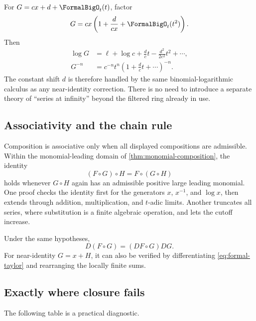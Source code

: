 \documentclass[11pt,oneside]{article}
\numberwithin{equation}{section}
\theoremstyle{definition}
\begin{document}
For \(G=cx+d+\FormalBigO_t(t)\), factor
\[
  G=cx\left(1+\frac{d}{cx}+\FormalBigO_t(t^2)\right).
\]
Then
\begin{align*}
  \log G
  &=\ell+\log c+\frac{d}{c}t-\frac{d^2}{2c^2}t^2+\cdots,\\
  G^{-n}
  &=c^{-n}t^n\left(1+\frac{d}{c}t+\cdots\right)^{-n}.
\end{align*}
The constant shift \(d\) is therefore handled by the same binomial-logarithmic
calculus as any near-identity correction.  There is no need to introduce a
separate theory of ``series at infinity'' beyond the filtered ring already in
use.

\subsection{Associativity and the chain rule}

Composition is associative only when all displayed compositions are admissible.
Within the monomial-leading domain of \cref{thm:monomial-composition}, the
identity
\begin{equation}\label{eq:composition-associativity}
  (F\circ G)\circ H=F\circ(G\circ H)
\end{equation}
holds whenever \(G\circ H\) again has an admissible positive large leading
monomial.  One proof checks the identity first for the generators \(x\),
\(x^{-1}\), and \(\log x\), then extends through addition, multiplication, and
\(t\)-adic limits.  Another truncates all series, where substitution is a finite
algebraic operation, and lets the cutoff increase.

Under the same hypotheses,
\begin{equation}\label{eq:chain-rule}
  D(F\circ G)=(DF\circ G)DG.
\end{equation}
For near-identity \(G=x+H\), it can also be verified by differentiating
\eqref{eq:formal-taylor} and rearranging the locally finite sums.

\subsection{Exactly where closure fails}

The following table is a practical diagnostic.
\end{document}
